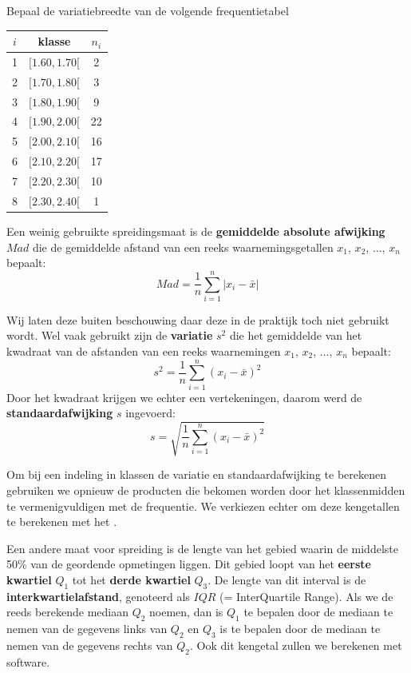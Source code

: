 \documentclass[12pt,twoside,a4paper]{article}
\begin{document}
\begin{oefening}
Bepaal de variatiebreedte van de volgende frequentietabel
\begin{center}
\begin{tabular}{c|c|c}
$i$ & klasse     & $n_i$\\
\hline
  1 & $[ 1.60,  1.70[$ &   2\\
  2 & $[ 1.70,  1.80[$ &   3\\
  3 & $[ 1.80,  1.90[$ &   9\\
  4 & $[ 1.90,  2.00[$ &   22\\
  5 & $[ 2.00,  2.10[$ &   16\\
  6 & $[ 2.10,  2.20[$ &   17\\
  7 & $[ 2.20,  2.30[$ &   10\\
  8 & $[ 2.30,  2.40[$ &   1\\
\end{tabular}
\end{center}
\end{oefening}

Een weinig gebruikte spreidingsmaat is de {\bf gemiddelde absolute afwijking} $Mad$ die de gemiddelde afstand van een reeks waarnemingsgetallen $x_1$, $x_2$, $\ldots$, $x_n$ bepaalt:
$$Mad=\dfrac{1}{n}\sum_{i=1}^n|x_i-\bar{x}|$$

Wij laten deze buiten beschouwing daar deze in de praktijk toch niet gebruikt wordt. Wel vaak gebruikt zijn de {\bf variatie} $s^2$ die het gemiddelde van het kwadraat van de afstanden van een reeks waarnemingen $x_1$, $x_2$, $\ldots$, $x_n$ bepaalt:
$$s^2=\dfrac{1}{n}\sum_{i=1}^n(x_i-\bar{x})^2$$
Door het kwadraat krijgen we echter een vertekeningen, daarom werd de {\bf standaardafwijking} $s$ ingevoerd:
$$s=\sqrt{\dfrac{1}{n}\sum_{i=1}^n(x_i-\bar{x})^2}$$

Om bij een indeling in klassen de variatie en standaardafwijking te berekenen gebruiken we opnieuw de producten die bekomen worden door het klassenmidden te vermenigvuldigen met de frequentie. We verkiezen echter om deze kengetallen te berekenen met het .

Een andere maat voor spreiding is de lengte van het gebied waarin de middelste 50\% van de
geordende opmetingen liggen. Dit gebied loopt van het {\bf eerste kwartiel} $Q_1$ tot het {\bf derde kwartiel} $Q_3$.
De lengte van dit interval is de {\bf interkwartielafstand}, genoteerd als $IQR$ (= InterQuartile Range).
Als we de reeds berekende mediaan $Q_2$ noemen, dan is $Q_1$ te bepalen door de mediaan te nemen van de
gegevens links van $Q_2$ en $Q_3$ is te bepalen door de mediaan te nemen van de gegevens rechts van $Q_2$. Ook
dit kengetal zullen we berekenen met software.
\end{document}
